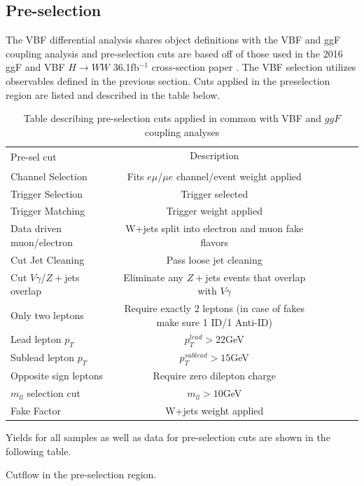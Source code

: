 \subsection{Pre-selection}
The VBF differential analysis shares object definitions with the VBF and ggF coupling analysis and pre-selection cuts are based off of those used in the 2016 ggF and VBF $H\rightarrow WW$ 36.1fb$^{-1}$ cross-section paper \cite{Aad:1975394}. The VBF selection utilizes observables defined in the previous section. Cuts applied in the preselection region are listed and described in the table below. 
\begin{table}[h!]
\centering
\small{
\begin{tabular}{|l|c|c|c|c|c|}
\hline
\multirow{2}{*}{Pre-sel cut}   & Description \\
				&	 \\
\hline
Channel Selection	& Fits $e\mu$/$\mu e$ channel/event weight applied\\  
Trigger Selection	&  Trigger selected \\
Trigger Matching	&  Trigger weight applied  \\
Data driven muon/electron & W+jets split into electron and muon fake flavors \\
Cut Jet Cleaning	& Pass loose jet cleaning \\
Cut $V\gamma$/$Z+$jets overlap & Eliminate any $Z+$jets events that overlap with $V\gamma$ \\ 
Only two leptons       	&  Require exactly 2 leptons (in case of fakes make sure 1 ID/1 Anti-ID) \\
Lead lepton $p_T$	& $p_T^{lead} > 22 $GeV \\
Sublead lepton $p_T$	& $p_T^{sublead} >15 $GeV \\
Opposite sign leptons	&  Require zero dilepton charge \\
$m_{ll}$ selection cut	&  $m_{ll} > 10$GeV \\
Fake Factor	& W+jets weight applied \\
\hline
\end{tabular}
\caption{Table describing pre-selection cuts applied in common with VBF and $ggF$ coupling analyses}
\label{tab:preseldef}
}
\end{table}

Yields for all samples as well as data for pre-selection cuts are shown in the following table.
\begin{table}[h!]
\scalebox{.35}{

}
\caption{Cutflow in the pre-selection region.}
\label{tab:preselcut}
\end{table}

